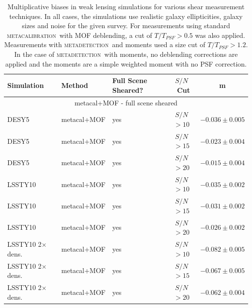 \documentclass[fleqn,useAMS,usenatbib]{mnras}
\newcommand{\snr}{$S/N$}
\newcommand{\mcal}{\textsc{metacalibration}}
\newcommand{\mdet}{\textsc{metadetection}}
\begin{document}
\begin{table}
  \centering
  \caption{
    Multiplicative biases in weak lensing simulations for various shear
    measurement techniques. In all cases, the simulations use realistic
    galaxy ellipticities, galaxy sizes and noise for the given survey. For measurements using standard \mcal\ with
    MOF deblending, a cut of $T/T_{PSF} > 0.5$ was also applied. Measurements with
    \mdet\ and moments used a size cut of $T/T_{PSF} > 1.2$. In the case of \mdet\ with moments,
    no deblending corrections are applied and the moments are a simple weighted moment
    with no PSF correction.}
  \label{tab:shearmeas}

  \begin{tabular}{|l|l|l|c|c|}
    \hline
    Simulation & Method & Full Scene Sheared? & \snr\ Cut & m \\
    \hline

    \hline
    \multicolumn{5}{c}{metacal+MOF - full scene sheared}\\
    \hline
    DESY5   & metacal+MOF & yes & \snr$ > 10$ & $-0.036 \pm 0.005$  \\
    DESY5   & metacal+MOF & yes & \snr$ > 15$ & $-0.023 \pm 0.004$  \\
    DESY5   & metacal+MOF & yes & \snr$ > 20$ & $-0.015 \pm 0.004$  \\
    \hline
    LSSTY10  & metacal+MOF & yes & \snr$ > 10$ & $-0.035 \pm 0.002$  \\
    LSSTY10  & metacal+MOF & yes & \snr$ > 15$ & $-0.031 \pm 0.002$  \\
    LSSTY10  & metacal+MOF & yes & \snr$ > 20$ & $-0.026 \pm 0.002$  \\
    \hline
    LSSTY10 2$\times$ dens. & metacal+MOF & yes & \snr$ > 10$ & $-0.082 \pm 0.005$  \\
    LSSTY10 2$\times$ dens. & metacal+MOF & yes & \snr$ > 15$ & $-0.067 \pm 0.005$  \\
    LSSTY10 2$\times$ dens. & metacal+MOF & yes & \snr$ > 20$ & $-0.062 \pm 0.004$  \\
    \hline


\end{tabular}
\end{table}
\end{document}
